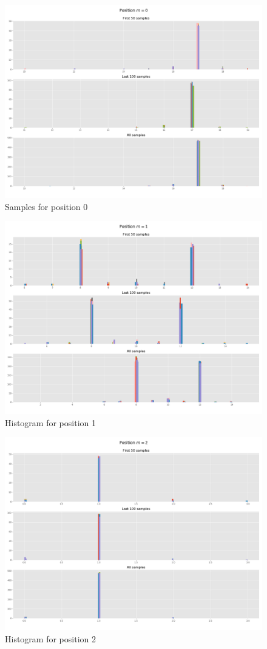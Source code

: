 \documentclass[]{article}
\begin{document}
	\begin{figure}[H]
		\begin{center}
			
			\includegraphics[width=.7\textwidth]{task4/figures/T_2_4/Q2/distribution_pos0.png}
			\caption*{Samples for position 0}
		\end{center}
	\end{figure}
	
	\begin{figure}[H]
		\begin{center}
			
			\includegraphics[width=.7\textwidth]{task4/figures/T_2_4/Q2/distribution_pos1.png}
			\caption*{Histogram for position 1}
		\end{center}
	\end{figure}
	
	\begin{figure}[H]
		\begin{center}
			
			\includegraphics[width=.7\textwidth]{task4/figures/T_2_4/Q2/distribution_pos2.png}
			\caption*{Histogram for position 2}
		\end{center}
	\end{figure}
	
\end{document}
